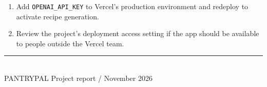 \documentclass[11pt]{article}
\begin{document}
\begin{enumerate}[leftmargin=1.5em,itemsep=4pt]
  \item Add \texttt{OPENAI\_API\_KEY} to Vercel's production environment and redeploy to activate recipe generation.
  \item Review the project's deployment access setting if the app should be available to people outside the Vercel team.
\end{enumerate}

\vfill
\noindent\textcolor{forest}{\rule{\linewidth}{1pt}}\\
{\small\color{muted}PANTRYPAL \hfill Project report / November 2026}
\end{document}
